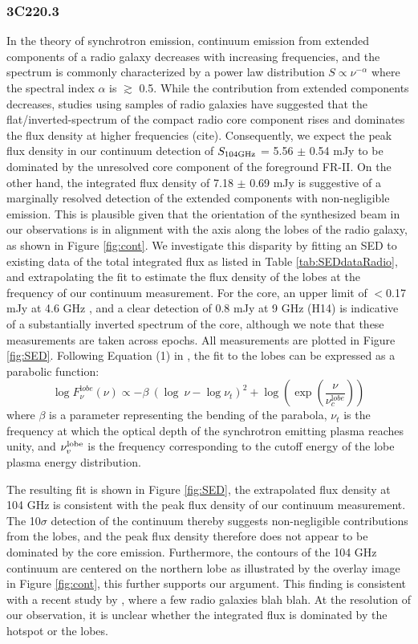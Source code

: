 \documentclass[twocolumn,apj,numberedappendix]{emulateapj}
\begin{document}
\subsubsection{3C220.3}
In the theory of synchrotron emission, continuum emission from extended components of a radio galaxy decreases with increasing frequencies, and the spectrum is commonly characterized by a power law distribution $S \propto \nu^{-\alpha}$ where the spectral index $\alpha$ is $\gtrsim$ 0.5. While the contribution from extended components decreases, studies using samples of radio galaxies have suggested that the flat/inverted-spectrum of the compact radio core component rises and dominates the flux density at higher frequencies (cite). Consequently, we expect the peak flux density in our continuum detection of $S_{\rm 104GHz}$ = 5.56 $\pm$ 0.54 mJy to be dominated by the unresolved core component of the foreground FR-II. On the other hand, the integrated flux density of 7.18 $\pm$ 0.69 mJy is suggestive of a marginally resolved detection of the extended components with non-negligible emission. This is plausible given that the orientation of the synthesized beam in our observations is in alignment with the axis along the 
lobes of the radio galaxy, as shown in Figure \ref{fig:cont}. We investigate this disparity by fitting an SED to existing data of the total integrated flux as listed in Table \ref{tab:SEDdataRadio}, and extrapolating the fit to estimate the flux density of the lobes at the frequency of our continuum measurement. For the core, an upper limit of $<$0.17 mJy at 4.6 GHz \citep{Mullin06a}, and a clear detection of 0.8 mJy at 9 GHz (H14) is indicative of a substantially inverted spectrum of the core, although we note that these measurements are taken across epochs. All measurements are plotted in Figure \ref{fig:SED}. 
Following Equation (1) in \citet{Cleary07a}, the fit to the lobes can be expressed as a parabolic function:
\begin{equation}
\log F_{\nu}^{\mathrm lobe} (\nu) \propto - \beta\ (\log\ \nu - \log \nu_{t})^2  + \log (\exp({\frac{\nu}{\nu_c^{\mathrm lobe}}}))
\end{equation}
where $\beta$ is a parameter representing the bending of the parabola, $\nu_t$ is the frequency at which the optical depth of the synchrotron emitting plasma reaches unity, and $\nu_v^{\rm lobe}$ is the frequency corresponding to the cutoff energy of the lobe plasma energy distribution. 

The resulting fit is shown in Figure \ref{fig:SED}, the extrapolated flux density at 104 GHz is consistent with the peak flux density of our continuum measurement. The 10$\sigma$ detection of the continuum thereby suggests
non-negligible contributions from the lobes, and the peak flux density therefore does not appear to be dominated by the core 
emission. Furthermore, the contours of the 104 GHz continuum are
centered on the northern lobe as illustrated by the overlay image in Figure \ref{fig:cont}, this further supports our argument. This finding is consistent with a recent study by \citet{Hardcastle08a}, where a few radio galaxies blah blah. At the resolution of our observation, it is unclear whether the integrated flux is dominated by the hotspot or the lobes. 
\end{document}
